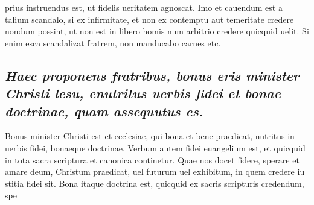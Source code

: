 \documentclass{article}
\begin{document}
\begin{pages}
prius instruendus est, ut fidelis ueritatem agnoscat. Imo et cauendum est a talium scandalo, si ex infirmitate, et non ex contemptu aut temeritate credere nondum possint, ut non est in libero homis num arbitrio credere quicquid uelit. Si enim esca scandalizat fratrem, non manducabo carnes etc.  \pend
{}
{}
\subsection*{\textit{Haec proponens fratribus, bonus eris minister Christi lesu, enutritus uerbis fidei et bonae doctrinae, quam assequutus es. }}\pstart Bonus minister Christi est et ecclesiae, qui bona et bene praedicat, nutritus in uerbis fidei, bonaeque doctrinae. Verbum autem fidei euangelium est, et quicquid in tota sacra scriptura et canonica continetur. Quae nos docet fidere, sperare et amare deum, Christum praedicat, uel futurum uel exhibitum, in quem credere iu stitia fidei sit. Bona itaque doctrina est, quicquid ex sacris scripturis credendum, spe\pend

\end{pages}
\end{document}

